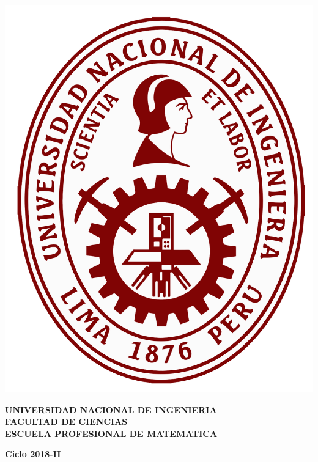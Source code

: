 \documentclass[a4paper,11pt]{article}
\begin{document}
	
	\begin{minipage}[c]{3.00cm}
		\includegraphics[scale=0.07]{uni.png}		
	\end{minipage}
	\begin{minipage}[c]{10cm}
		{\bf UNIVERSIDAD NACIONAL DE INGENIERIA\\
		FACULTAD DE CIENCIAS\\
		ESCUELA PROFESIONAL DE MATEMATICA}
	\end{minipage}
	\begin{minipage}[c]{4cm}
		\hfill {\bf Ciclo 2018-II}
	\end{minipage}
\end{document}
